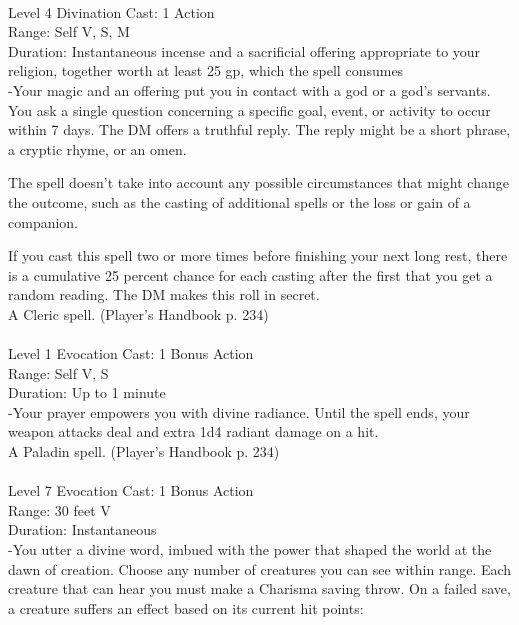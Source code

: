 \documentclass[10pt,twocolumn]{report}
\begin{document}
 \\
Level 4 \quad Divination \quad Cast: 1 Action\\
Range: Self \quad V, S, M \\
Duration: Instantaneous \quad incense and a sacrificial offering appropriate to your religion, together worth at least 25 gp, which the spell consumes\\
-Your magic and an offering put you in contact with a god or a god’s servants. You ask a single question concerning a specific goal, event, or activity to occur within 7 days. The DM offers a truthful reply. The reply might be a short phrase, a cryptic rhyme, or an omen. 

The spell doesn’t take into account any possible circumstances that might change the outcome, such as the casting of additional spells or the loss or gain of a companion. 

If you cast this spell two or more times before finishing your next long rest, there is a cumulative 25 percent chance for each casting after the first that you get a random reading. The DM makes this roll in secret.\\
A Cleric spell. (Player's Handbook p. 234) \\


 \\
Level 1 \quad Evocation \quad Cast: 1 Bonus Action\\
Range: Self \quad V, S\\
Duration: Up to 1 minute \quad \\
-Your prayer empowers you with divine radiance. Until the spell ends, your weapon attacks deal and extra 1d4 radiant damage on a hit.\\
A Paladin spell. (Player's Handbook p. 234) \\


 \\
Level 7 \quad Evocation \quad Cast: 1 Bonus Action\\
Range: 30 feet \quad V\\
Duration: Instantaneous \quad \\
-You utter a divine word, imbued with the power that shaped the world at the dawn of creation. 
Choose any number of creatures you can see within range. Each creature that can hear you must make a Charisma saving throw. On a failed save, a creature suffers an effect based on its current hit points: 
\end{document}
